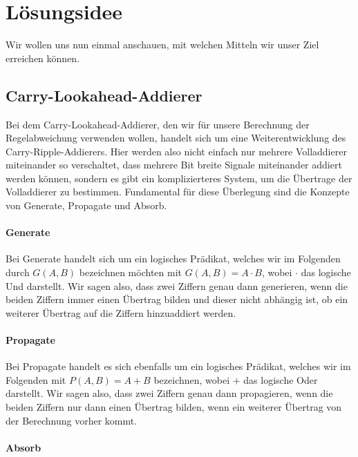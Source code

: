 \documentclass{report}
\begin{document}
\section{Lösungsidee}
\label{sec:losungsidee-1}

Wir wollen uns nun einmal anschauen, mit welchen Mitteln wir unser Ziel erreichen können.

\subsection{Carry-Lookahead-Addierer}
\label{sec:carry-look-addi}

Bei dem Carry-Lookahead-Addierer, den wir für unsere Berechnung der Regelabweichung verwenden wollen, handelt sich um eine Weiterentwicklung des Carry-Ripple-Addierers. Hier werden also nicht einfach nur mehrere Volladdierer miteinander so verschaltet, dass mehrere Bit breite Signale miteinander addiert werden können, sondern es gibt ein komplizierteres System, um die Übertrage der Volladdierer zu bestimmen. Fundamental für diese Überlegung sind die Konzepte von Generate, Propagate und Absorb.\cite{skript}

\paragraph{Generate}

Bei Generate handelt sich um ein logisches Prädikat, welches wir im Folgenden durch $G(A, B)$ bezeichnen möchten mit $G(A,B) = A \cdot B$, wobei $\cdot$ das logische Und darstellt. Wir sagen also, dass zwei Ziffern genau dann generieren, wenn die beiden Ziffern immer einen Übertrag bilden und dieser nicht abhängig ist, ob ein weiterer Übertrag auf die Ziffern hinzuaddiert werden.

\paragraph{Propagate}

Bei Propagate handelt es sich ebenfalls um ein logisches Prädikat, welches wir im Folgenden mit $P(A,B) = A + B$ bezeichnen, wobei $+$ das logische Oder darstellt. Wir sagen also, dass zwei Ziffern genau dann propagieren, wenn die beiden Ziffern nur dann einen Übertrag bilden, wenn ein weiterer Übertrag von der Berechnung vorher kommt.

\paragraph{Absorb}
\end{document}
